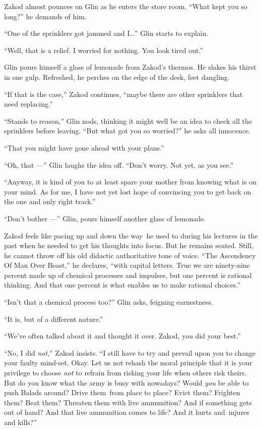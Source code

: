 \documentclass[twoside,11pt,openany]{book}
\begin{document}
Zakod almost pounces on Glin as he enters the store room. ``What kept you so long?'' he
demands of him.

``One of the sprinklers got jammed and I{\ldots}'' Glin starts to explain.

``Well, that is a relief. I worried for nothing. You look tired out.''

Glin pours himself a glass of lemonade from Zakod's thermos. He{ }slakes his
thirst in one gulp. Refreshed, he perches on the edge of the desk, feet dangling.

{}``If that is the case,'' Zakod continues, ``maybe there are other sprinklers that need replacing.''

``Stands to reason,'' Glin nods, thinking it might well be an idea to check all the sprinklers
before leaving. ``But what got you so worried?'' he asks all innocence.

``That you might have gone ahead with your plans.''

``Oh, that ---'' Glin laughs the idea off. ``Don't worry. Not yet, as you
see.''

``Anyway, it is kind of you to at least spare your mother from knowing what is on your mind. As for me, I
have not yet lost hope of convincing you to get back on the one and only right track.''

``Don't bother ---'' Glin, pours himself another glass of lemonade.

Zakod feels like pacing up and down the way~he used to during his lectures in the past when he needed to get his
thoughts into focus. But he remains seated. Still, he cannot throw off his old didactic authoritative tone of voice.
``The Ascendency Of Man Over Beast,'' he declares, ``with capital letters. True we are
ninety-nine percent made up of chemical processes and impulses, but one percent is rational thinking. And that one
percent is what enables us to make rational choices.''

``Isn't that a chemical process too?'' Glin
asks, feigning earnestness.

``It is, but of a different nature.''

``We've often talked about it and thought it over.  Zakod, you did your best.''

``No, I did \textit{not},'' Zakod insists. ``I still have to try and prevail upon
you to change your faulty mind-set. Okay. Let us not rehash the moral principle that it is your privilege to choose
\textit{not} to refrain from risking your life when others risk theirs. But do you know what the army is busy with
nowadays? Would \textit{you} be able to push Balads around? Drive them~from place to place? Evict them? Frighten them?
Beat them? Threaten them with live ammunition? And if something gets out of hand? And that live ammunition comes to
life? And it hurts and~injures and kills?''
\end{document}
